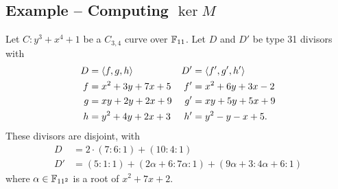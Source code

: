 \begin{comment}
This algorithm requires that we be able to reduce divisors
in lines \ref{alg_addition:return_2}, \ref{alg_addition:return_3}, and \ref{alg_addition:return_4},
to double divisors in lines \ref{alg_addition:return_3} and \ref{alg_addition:return_4},
or possibly to triple degree 1 divisors in line \ref{alg_addition:return_4}.
Assume for now that we have terminating algorithms for these operations.
We wish to show that the addition Algorithm \ref{alg_addition}.

This algorithm has five return statements.
If the algorithm reaches \ref{alg_addition:return_0} or \ref{alg_addition:return_1},
then the algorithm terminates.
If the algorithm returns at line \ref{alg_addition:return_4},
then $(n + 1)D'$ and $A$ will be disjoint,
and the algorithm will reach at line \ref{alg_addition:return_1} in its next iteration
(or line \ref{alg_addition:return_0} if $A = 0$).
At lines \ref{alg_addition:return_2} and \ref{alg_addition:return_3},
$G$ and $A$ are of lesser degree than $D'$.
Eventually, a recursive call will involve $D'$ of degree 0 --
in which case the next interation reaches line \ref{alg_addition:return_0} --
or 1 --
in which case $\rank M$ is either 1 or 0
and the next iteration reaches line \ref{alg_addition:return_1} or \ref{alg_addition:return_4} and terminates.

Whether or not this algorithm terminates therefore depends on whether we have terminating algorithms
for reducing divisors, doubling divisors, and tripling points.
These are the topics of the next two chapters.
\end{comment}



\subsection{Example -- Computing $\ker M$}

Let $C : y^3 + x^4 + 1$ be a $C_{3,4}$ curve over $\mathbb{F}_{11}$.
Let $D$ and $D'$ be type 31 divisors with
\begin{align*}
  D  &= \left\langle f, g, h \right\rangle     & D' &= \left\langle f', g', h' \right\rangle \\
  f  &= x^2 + 3y + 7x + 5 & f' &= x^2 + 6y + 3x - 2 \\
  g  &= xy + 2y + 2x + 9  & g' &= xy + 5y + 5x + 9 \\
  h  &= y^2 + 4y + 2x + 3 & h' &= y^2 - y - x + 5.
\end{align*}
These divisors are disjoint, with
\begin{align*}
  D &= 2 \cdot (7 : 6 : 1) + (10 : 4 : 1) \\
  D' &= (5 : 1 : 1) + (2\alpha + 6 : 7\alpha : 1) + (9\alpha + 3 : 4\alpha + 6 : 1)
\end{align*}
where $\alpha \in \mathbb{F}_{11^2}$ is a root of $x^2 + 7x + 2$.

